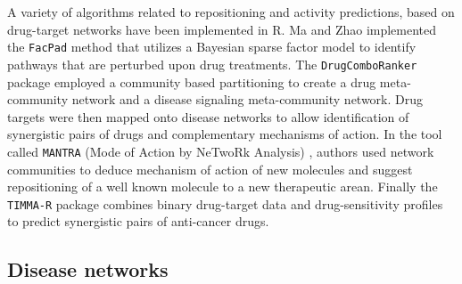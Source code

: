 \documentclass[]{book}
\begin{document}
A variety of algorithms related to repositioning and activity
predictions, based on drug-target networks have been implemented in
R. Ma and Zhao \cite{Ma:2012qy} implemented the \texttt{FacPad} method
that utilizes a Bayesian sparse factor model to identify pathways that
are perturbed upon drug treatments. The \texttt{DrugComboRanker}
package \cite{Huang:2014by} employed a community based partitioning to
create a drug meta-community network and a disease signaling
meta-community network. Drug targets were then mapped onto disease
networks to allow identification of synergistic pairs of drugs and
complementary mechanisms of action. In the tool called \texttt{MANTRA}
(Mode of Action by NeTwoRk Analysis) \cite{iorio2010discovery},
authors used network communities to deduce mechanism of action of new
molecules and suggest repositioning of a well known molecule to a new
therapeutic arean. Finally the \texttt{TIMMA-R} package
\cite{He:2015ly} combines binary drug-target data and drug-sensitivity
profiles to predict synergistic pairs of anti-cancer drugs.



\subsection{Disease networks}
\label{sec:disease-networks}
\end{document}
